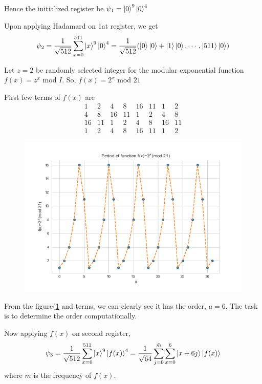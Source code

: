 Hence the initialized register be $\psi_1 = \ket{0}^9\ket{0}^4$

Upon applying Hadamard on 1at register, we get
$$\psi_2 = \frac{1}{\sqrt{512}} \sum_{x=0}^{511} \ket{x}^9\ket{0}^4 = \frac{1}{\sqrt{512}} (\ket{0}\ket{0} + \ket{1}\ket{0},\cdots , \ket{511}\ket{0}) $$

Let $z=2$ be randomly selected integer for the modular exponential function $f(x)= z^x$ mod $I$.
So, $f(x) = 2^x$ mod $21 $

First few terms of $f(x)$ are 
{\scriptsize $$\begin{matrix}
     1  &   2  &   4  &   8  &  16  &  11  &   1  &   2 \\
  4  &   8  &  16  &  11  &   1  &   2  &   4  &   8 \\
  16  &  11  &   1  &   2  &   4  &   8  &  16  &  11 \\
  1  &   2  &   4  &   8  &  16  &  11  &   1  &   2 
\end{matrix}$$}
\begin{figure}[H]
    \centering
    \includegraphics[scale=0.4]{figures/periodicfunction(2,21).png} 
    \label{fig: periodicfunction(2,21)}
\end{figure}
From the figure(\ref{fig: periodicfunction(2,21)} and terms, we can clearly see it has the order, $a=6$. The task is to determine the order computationally.

Now applying $f(x)$ on second register,
 $$\psi_3 = \frac{1}{\sqrt{512}} \sum_{x=0}^{511} \ket{x}^9\ket{f(x)}^4 =  \frac{1}{\sqrt{64}} \sum_{j=0}^{\tilde{m}} \sum_{x=0}^{6} \ket{x +6j} \ket{f(x)}$$ where $\tilde{m}$ is the frequency of $f(x)$.
 
